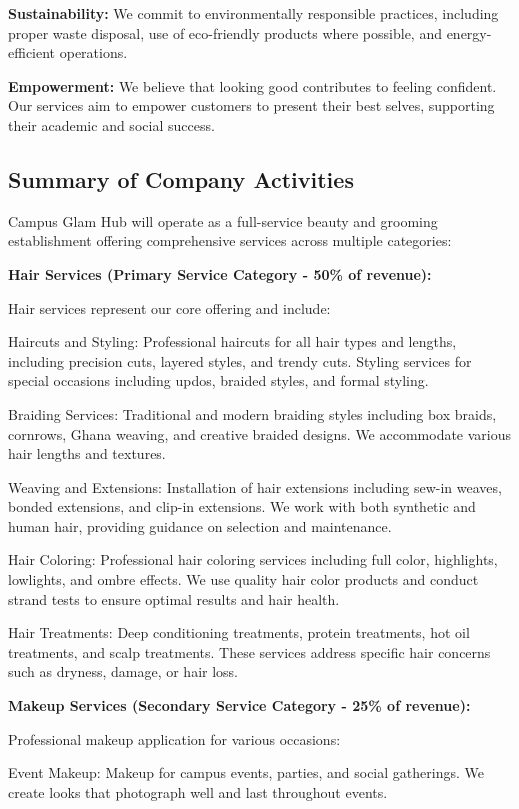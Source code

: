 \documentclass[a4paper,12pt]{article}
\begin{document}
\textbf{Sustainability:} We commit to environmentally responsible practices, including proper waste disposal, use of eco-friendly products where possible, and energy-efficient operations.

\textbf{Empowerment:} We believe that looking good contributes to feeling confident. Our services aim to empower customers to present their best selves, supporting their academic and social success.

\subsection{Summary of Company Activities}

Campus Glam Hub will operate as a full-service beauty and grooming establishment offering comprehensive services across multiple categories:

\textbf{Hair Services (Primary Service Category - 50\% of revenue):}

Hair services represent our core offering and include:

Haircuts and Styling: Professional haircuts for all hair types and lengths, including precision cuts, layered styles, and trendy cuts. Styling services for special occasions including updos, braided styles, and formal styling.

Braiding Services: Traditional and modern braiding styles including box braids, cornrows, Ghana weaving, and creative braided designs. We accommodate various hair lengths and textures.

Weaving and Extensions: Installation of hair extensions including sew-in weaves, bonded extensions, and clip-in extensions. We work with both synthetic and human hair, providing guidance on selection and maintenance.

Hair Coloring: Professional hair coloring services including full color, highlights, lowlights, and ombre effects. We use quality hair color products and conduct strand tests to ensure optimal results and hair health.

Hair Treatments: Deep conditioning treatments, protein treatments, hot oil treatments, and scalp treatments. These services address specific hair concerns such as dryness, damage, or hair loss.

\textbf{Makeup Services (Secondary Service Category - 25\% of revenue):}

Professional makeup application for various occasions:

Event Makeup: Makeup for campus events, parties, and social gatherings. We create looks that photograph well and last throughout events.
\end{document}
